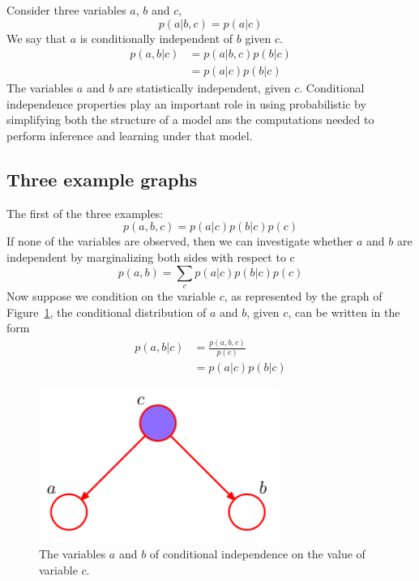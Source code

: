 \documentclass[5p,sort&compress]{elsarticle}
\begin{document}
Consider three variables $a$, $b$ and $c$,
\begin{equation}
p(a | b, c)=p(a | c)
\end{equation}
We say that $a$ is conditionally independent of $b$ given $c$. 
\begin{equation}
\begin{aligned} p(a, b | c) &=p(a | b, c) p(b | c) \\ &=p(a | c) p(b | c) \end{aligned}
\end{equation}
The variables $a$ and $b$ are statistically independent, given $c$. Conditional independence properties play an important role in using probabilistic by simplifying both the structure of a model ans the computations needed to perform inference and learning under that model.

\subsection{Three example graphs}

The first of the three examples:
\begin{equation}
    p(a,b,c) = p(a|c) p(b|c) p(c)
\end{equation}
If none of the variables are observed, then we can investigate whether $a$ and $b$ are independent by marginalizing both sides with respect to c
\begin{equation}
p(a, b)=\sum_{c} p(a | c) p(b | c) p(c)
\end{equation}
Now suppose we condition on the variable $c$, as represented by the graph of Figure~\ref{fig:8_16}, the conditional distribution of $a$ and $b$, given $c$, can be written in the form
\begin{equation}
\begin{aligned} p(a, b | c) &=\frac{p(a, b, c)}{p(c)} \\ &=p(a | c) p(b | c) \end{aligned}
\end{equation}


\begin{figure}[ht]
     \centering
     \includegraphics[width = 0.6\linewidth]{figure/figure8_16.png}
     \caption{The variables $a$ and $b$ of conditional independence on the value of variable $c$.}
     \label{fig:8_16}
\end{figure}
\end{document}
